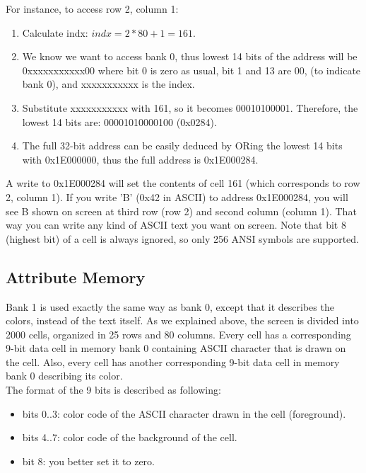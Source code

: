 \documentclass[oneside]{book}
\begin{document}
For instance, to access row 2, column 1:

\begin{enumerate}

\item Calculate indx: $indx=2*80+1=161$.
\item We know we want to access bank 0, thus lowest 14 bits of the address
      will be 0xxxxxxxxxxx00 where bit 0 is zero as usual, bit 1 and 13 are 00,
      (to indicate bank 0), and xxxxxxxxxxx is the index.
\item Substitute xxxxxxxxxxx with 161, so it becomes 00010100001. Therefore,
      the lowest 14 bits are: 00001010000100 (0x0284).
\item The full 32-bit address can be easily deduced by ORing the lowest 14 bits
      with 0x1E000000, thus the full address is 0x1E000284.

\end{enumerate}

A write to 0x1E000284 will set the contents of cell 161 (which corresponds to
row 2, column 1). If you write 'B' (0x42 in ASCII) to address 0x1E000284, you
will see B shown on screen at third row (row 2) and second column (column 1).
That way you can write any kind of ASCII text you want on screen. Note that
bit 8 (highest bit) of a cell is always ignored, so only 256 ANSI symbols
are supported.

\subsection{Attribute Memory}

Bank 1 is used exactly the same way as bank 0, except that it describes
the colors, instead of the text itself. As we explained above, the screen
is divided into 2000 cells, organized in 25 rows and 80 columns. Every
cell has a corresponding 9-bit data cell in memory bank 0 containing ASCII
character that is drawn on the cell. Also, every cell has another
corresponding 9-bit data cell in memory bank 0 describing its color.\\

The format of the 9 bits is described as following:

\begin{itemize}

\item bits 0..3: color code of the ASCII character drawn in the cell
                 (foreground).
\item bits 4..7: color code of the background of the cell.
\item bit 8: you better set it to zero.

\end{itemize}
\end{document}
